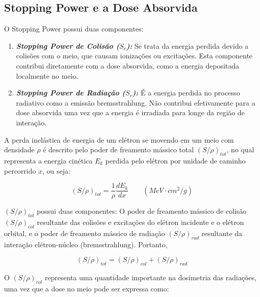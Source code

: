 \documentclass[11pt,a4paper]{article}
\begin{document}
        \subsection{Stopping Power e a Dose Absorvida}

            O Stopping Power possui duas componentes:

                \begin{enumerate}
                    \item \textbf{\textit{\textcolor{CarnationPink}{Stopping Power de Colisão ($S_c$)}:}} Se trata da energia perdida devido a colisões com o meio, que causam ionizações ou excitações. Esta componente contribui diretamente com a dose absorvida, como a energia depositada localmente no meio. 
                    
                    \item \textbf{\textit{\textcolor{CarnationPink}{Stopping Power de Radiação ($S_r$)}:}} É a energia perdida no processo radiativo como a emissão bremsstrahlung. Não contribui efetivamente para a dose absorvida uma vez que a energia é irradiada para longe da região de interação.
                \end{enumerate}

            A perda inelástica de energia de um elétron se movendo em um meio com densidade $\rho$ é descrito pelo poder de freamento mássico total $(S/\rho)_{tot}$, no qual representa a energia cinética $E_k$ perdida pelo elétron por unidade de caminho percorrido $x$, ou seja:

                \begin{equation}
                    (S/\rho)_{tot} = \frac{1}{\rho} \frac{d E_k}{d x} \qquad (MeV \cdot cm^2/g)
                \end{equation}

            $(S/\rho)_{tot}$ possui duas componentes: O poder de freamento mássico de colisão $(S/\rho)_{col}$ resultante das colisões e excitações do elétron incidente e o elétron orbital,  e o poder de freamento mássico de radiação $(S/\rho)_{rad}$ resultante da interação elétron-núcleo (bremsstrahlung). Portanto,

                \begin{equation}
                    (S/\rho)_{tot} = (S/\rho)_{col} + (S/\rho)_{rad}
                \end{equation}

            O $(S/\rho)_{col}$ representa uma quantidade importante na dosimetria das radiações, uma vez que a dose no meio pode ser expressa como:
\end{document}
